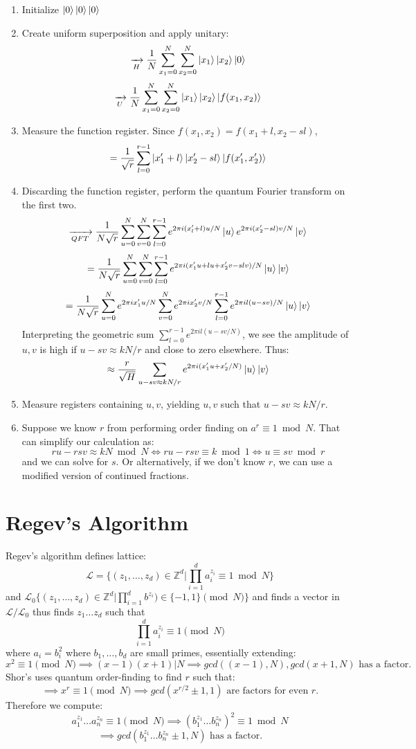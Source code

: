 \documentclass{article}
\begin{document}
\begin{enumerate}
	\item Initialize $\ket{0}\ket{0}\ket{0}$
	\item Create uniform superposition and apply unitary:
		$$\xrightarrow[H]{}\frac{1}{N} \sum_{x_1 = 0}^{N} \sum_{x_2 = 0}^{N} \ket{x_1}\ket{x_2}\ket{0}$$
	$$\xrightarrow[U]{}\frac{1}{N} \sum_{x_1 = 0}^{N} \sum_{x_2 = 0}^{N} \ket{x_1}\ket{x_2}\ket{f(x_1,x_2)}$$
\item Measure the function register.
Since $f(x_1,x_2) = f(x_1 + l, x_2 - sl)$,
$$ = \frac{1}{\sqrt{r}} \sum_{l = 0}^{r-1} \ket{x_1' + l}\ket{x_2'-sl}\ket{f(x_1',x_2')}$$
\item Discarding the function register, perform the quantum Fourier transform on the first two.
	$$\xrightarrow[QFT]{} \frac{1}{N\sqrt{r}} \sum_{u=0}^{N} \sum_{v=0}^{N} \sum_{l=0}^{r-1} e^{2\pi i (x'_l + l)u/N} \ket{u} e^{2\pi i (x'_2 - sl) v/N}\ket{v}$$
	$$= \frac{1}{N\sqrt{r}} \sum_{u=0}^N \sum_{v = 0}^N \sum_{l=0}^{r-1} e^{2\pi i (x'_1u + lu + x_2'v - slv)/N} \ket{u}\ket{v}$$
	$$=\frac{1}{N\sqrt{r}} \sum_{u=0}^{N} e^{2\pi i x_1' u/N}\sum_{v=0}^{N} e^{2\pi i x_2' v/N}\sum_{l=0}^{r-1} e^{2\pi i l(u-sv)/N}\ket{u}\ket{v}$$
	Interpreting the geometric sum $\sum_{l=0}^{r-1} e^{2\pi il (u-sv/N)}$, we see the amplitude of $u,v$ is high if $u-sv \approx kN/r$ and close to zero elsewhere. Thus:
	$$ \approx \frac{r}{\sqrt{H}} \sum_{u-sv \approx kN/r} e^{2\pi i(x_1' u + x'_2 / N)} \ket{u}\ket{v}$$
\item Measure registers containing $u,v$, yielding $u,v$ such that $u-sv \approx kN/r$.
\item Suppose we know $r$ from performing order finding on $a^r \equiv 1 \bmod N$. That can simplify our calculation as:
	$$ru-rsv \approx kN \bmod N \iff ru - rsv \equiv k \bmod 1 \iff u \equiv sv\bmod r$$
	and we can solve for $s$. Or alternatively, if we don't know $r$, we can use a modified version of continued fractions.
\end{enumerate}
\section{Regev's Algorithm}
Regev's algorithm defines lattice:
$$\mathcal{L} = \{ (z_1, \dots, z_d) \in \mathbb{Z}^d | \prod_{i=1}^{d} a_i^{z_i} \equiv 1 \bmod N\}$$
and $\mathcal{L}_0 \{ (z_1, \dots, z_d) \in \mathbb{Z}^d | \prod_{i=1}^{d} b^{z_i}) \in \{-1, 1\} \pmod {N}\}$
and finds a vector in $\mathcal{L} / \mathcal{L}_0$ thus finds $z_1\dots z_d$ such that 
$$ \prod_{i=1}^{d} a^{z_i}_i \equiv 1 \pmod N$$
where $a_i = b_i^2$ where $b_1, \dots, b_d$ are small primes, essentially extending:
$$x^2 \equiv 1 \pmod N \implies (x-1)(x+1) | N \implies gcd((x-1), N), gcd(x+1, N) \text{ has a factor.}$$
Shor's uses quantum order-finding to find $r$ such that:
$$\implies x^r \equiv 1 \pmod N \implies gcd(x^{r/2} \pm 1, 1) \text{ are factors for even $r$.}$$
Therefore we compute:
$$a_1^{z_1}\dots a_n^{z_n} \equiv 1 \pmod N \implies (b_1^{z_1}\dots b_n^{z_n})^2 \equiv 1 \bmod N$$
$$\implies gcd(b_1^{z_1}\dots b_n^{z_n} \pm 1, N) \text{ has a factor.}$$
\end{document}
